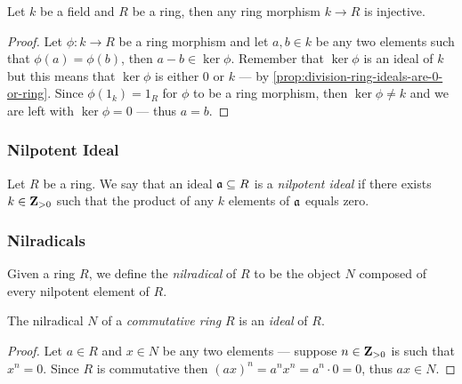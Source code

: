 \begin{proposition}
\label{prop:morphism-field-to-ring-is-injective}
Let \(k\) be a field and \(R\) be a ring, then any ring morphism \(k \to R\) is
injective.
\end{proposition}

\begin{proof}
Let \(\phi: k \to R\) be a ring morphism and let \(a, b \in k\) be any two
elements such that \(\phi(a) = \phi(b)\), then \(a - b \in \ker \phi\). Remember
that \(\ker \phi\) is an ideal of \(k\) but this means that \(\ker \phi\) is
either \(0\) or \(k\) --- by
\cref{prop:division-ring-ideals-are-0-or-ring}. Since \(\phi(1_k) = 1_R\) for
\(\phi\) to be a ring morphism, then \(\ker \phi \neq k\) and we are left with
\(\ker \phi = 0\) --- thus \(a = b\).
\end{proof}

\subsubsection{Nilpotent Ideal}

\begin{definition}
\label{def:nilpotent-ideal}
Let \(R\) be a ring. We say that an ideal \(\mathfrak{a} \subseteq R\) is a \emph{nilpotent
  ideal} if there exists \(k \in \mathbf{Z}_{> 0}\) such that the product of any \(k\)
elements of \(\mathfrak{a}\) equals zero.
\end{definition}

\subsubsection{Nilradicals}

\begin{definition}[Nilradical]
\label{def:nilradical}
Given a ring \(R\), we define the \emph{nilradical} of \(R\)
to be the object \(N\) composed of every nilpotent element of \(R\).
\end{definition}

\begin{corollary}
\label{cor:nilradical-is-ideal}
The nilradical \(N\) of a \emph{commutative ring} \(R\) is an \emph{ideal} of
\(R\).
\end{corollary}

\begin{proof}
Let \(a \in R\) and \(x \in N\) be any two elements --- suppose \(n \in
\mathbf{Z}_{>0}\) is such that \(x^n = 0\). Since \(R\) is commutative then \((a x)^n =
a^n x^n = a^n \cdot 0 = 0\), thus \(a x \in N\).
\end{proof}

